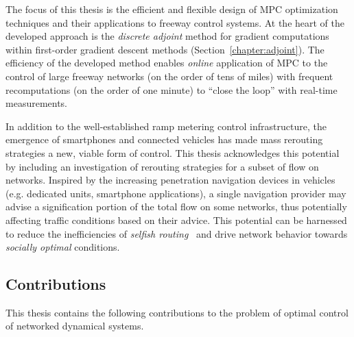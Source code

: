 The focus of this thesis is the efficient and flexible design of MPC optimization techniques and their applications to freeway control systems. At the heart of the developed approach is the \emph{discrete adjoint} method for gradient computations within first-order gradient descent methods (Section~\ref{chapter:adjoint}). The efficiency of the developed method enables \emph{online} application of MPC to the control of large freeway networks (on the order of tens of miles) with frequent recomputations (on the order of one minute) to ``close the loop'' with real-time measurements.

In addition to the well-established ramp metering control infrastructure, the emergence of smartphones and connected vehicles has made mass rerouting strategies a new, viable form of control. This thesis acknowledges this potential by including an investigation of rerouting strategies for a subset of flow on networks. Inspired by the increasing penetration navigation devices in vehicles (e.g. dedicated units, smartphone applications), a single navigation provider may advise a signification portion of the total flow on some networks, thus potentially affecting traffic conditions based on their advice. This potential can be harnessed to reduce the inefficiencies of \emph{selfish routing}~\cite{Krichene2012c,Roughgarden2002How} and drive network behavior towards \emph{socially optimal} conditions.

\subsection{Contributions}
\label{sec:contributions}

This thesis contains the following contributions to the problem of optimal control of networked dynamical systems.

